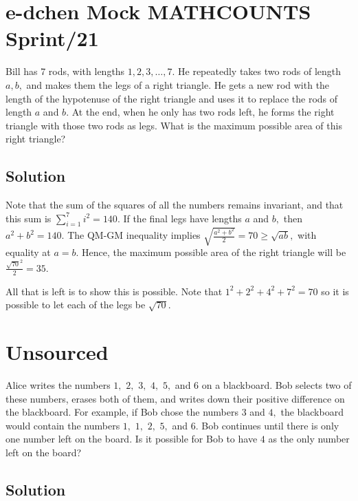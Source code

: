 \documentclass[blue,onecol]{shooting}
\begin{document}
{\hypersetup{
    citecolor=black,
    filecolor=black,
    linkcolor=black,
    urlcolor=black}\tableofcontents
}

\section{e-dchen Mock MATHCOUNTS Sprint/21}

Bill has 7 rods, with lengths $1,2,3,\dots,7.$ He repeatedly takes two rods of length $a,b,$ and makes them the legs of a right triangle. He gets a new rod with the length of the hypotenuse of the right triangle and uses it to replace the rods of length $a$ and $b.$ At the end, when he only has two rods left, he forms the right triangle with those two rods as legs. What is the maximum possible area of this right triangle?

\subsection{Solution}

Note that the sum of the squares of all the numbers remains invariant, and that this sum is $\displaystyle \sum_{i=1}^7 i^2 = 140$. If the final legs have lengths $a$ and $b,$ then $a^2+b^2=140.$ The QM-GM inequality implies $\sqrt{\frac{a^2+b^2}{2}}=70 \ge \sqrt{ab},$ with equality at $a=b$. Hence, the maximum possible area of the right triangle will be $\frac{\sqrt{70}^2}{2} = 35.$

All that is left is to show this is possible. Note that $1^2 + 2^2 + 4^2 + 7^2 = 70$ so it is possible to let each of the legs be $\sqrt{70}.$

\section{Unsourced}

Alice writes the numbers $1,$ $2,$ $3,$ $4,$ $5,$ and $6$ on a blackboard. Bob selects two of these numbers, erases both of them, and writes down their positive difference on the blackboard. For example, if Bob chose the numbers $3$ and $4,$ the blackboard would contain the numbers $1,$ $1,$ $2,$ $5,$ and $6.$ Bob continues until there is only one number left on the board. Is it possible for Bob to have $4$ as the only number left on the board?

\subsection{Solution}
\end{document}
